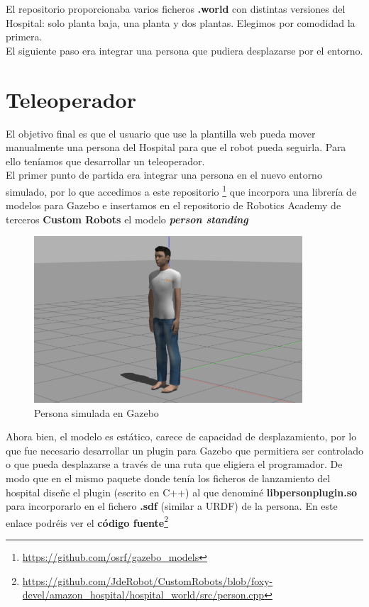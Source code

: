 El repositorio proporcionaba varios ficheros \textbf{.world} con distintas versiones del Hospital: solo planta baja, una planta y dos plantas. Elegimos por comodidad la primera.\\

El siguiente paso era integrar una persona que pudiera desplazarse por el entorno.



\section{Teleoperador}
\label{sec:teleoperador}

El objetivo final es que el usuario que use la plantilla web pueda mover manualmente una persona del Hospital para que el robot pueda seguirla. Para ello teníamos que desarrollar un teleoperador.\\

El primer punto de partida era integrar una persona en el nuevo entorno simulado, por lo que accedimos a este repositorio \footnote{\url{https://github.com/osrf/gazebo_models}} que incorpora una librería de modelos para Gazebo e insertamos en el repositorio de Robotics Academy de terceros \textbf{Custom Robots} el modelo \textbf{\textit{person standing}}

\begin{figure} [H]
  \begin{center}
    \includegraphics[width=10cm]{imagenes/person_model.png}
  \end{center}
  \caption[Persona simulada en Gazebo]{Persona simulada en Gazebo}
  \label{fig:persona_gazebo}
\end{figure}

Ahora bien, el modelo es estático, carece de capacidad de desplazamiento, por lo que fue necesario desarrollar un plugin para Gazebo que permitiera ser controlado o que pueda desplazarse a través de una ruta que eligiera el programador. De modo que en el mismo paquete donde tenía los ficheros de lanzamiento del hospital diseñe el plugin (escrito en C++) al que denominé \textbf{libpersonplugin.so} para incorporarlo en el fichero \textbf{.sdf} (similar a URDF) de la persona. En este enlace podréis ver el \textbf{código fuente}\footnote{\url{https://github.com/JdeRobot/CustomRobots/blob/foxy-devel/amazon_hospital/hospital_world/src/person.cpp}}\\

